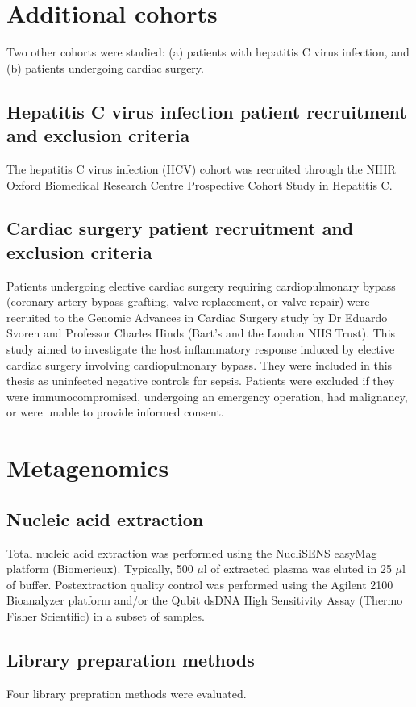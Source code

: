 \section{Additional cohorts}
Two other cohorts were studied: (a) patients with hepatitis C virus infection, and (b) patients undergoing cardiac surgery.

\subsection{Hepatitis C virus infection patient recruitment and exclusion criteria}
The hepatitis C virus infection (HCV) cohort was recruited through the NIHR Oxford Biomedical Research Centre Prospective Cohort Study in Hepatitis C. 

\subsection{Cardiac surgery patient recruitment and exclusion criteria}
Patients undergoing elective cardiac surgery requiring cardiopulmonary bypass (coronary artery bypass grafting, valve replacement, or valve repair) were recruited to the Genomic Advances in Cardiac Surgery study by Dr Eduardo Svoren and Professor Charles Hinds (Bart's and the London NHS Trust). This study aimed to investigate the host inflammatory response induced by elective cardiac surgery involving cardiopulmonary bypass. They were included in this thesis as uninfected negative controls for sepsis. Patients were excluded if they were immunocompromised, undergoing an emergency operation, had malignancy, or were unable to provide informed consent. 


\section{Metagenomics}
\subsection{Nucleic acid extraction}

Total nucleic acid extraction was performed using the NucliSENS easyMag platform (Biomerieux). Typically, 500 $\mu$l of extracted plasma was eluted in 25 $\mu$l of buffer. Postextraction quality control was performed using the Agilent 2100 Bioanalyzer platform and/or the Qubit dsDNA High Sensitivity Assay (Thermo Fisher Scientific) in a subset of samples.

\subsection{Library preparation methods}
Four library prepration methods were evaluated.

